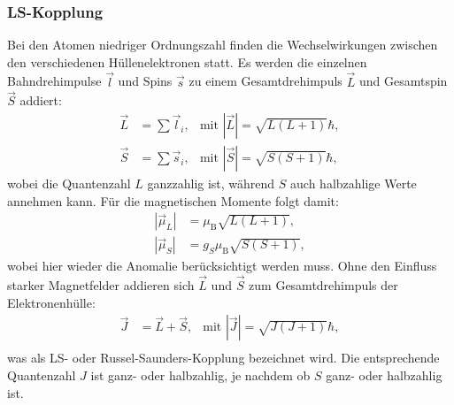 \documentclass{article}
\begin{document}
	\subsubsection{LS-Kopplung}
	Bei den Atomen niedriger Ordnungszahl finden die Wechselwirkungen zwischen den verschiedenen Hüllenelektronen statt. Es werden die einzelnen Bahndrehimpulse $\vec{l}$ und Spins $\vec{s}$ zu einem Gesamtdrehimpuls $\vec{L}$ und Gesamtspin $\vec{S}$ addiert:
	\begin{align}
	\vec{L}&=\sum\vec{l}_i, & \text{mit }|\vec{L}|=\sqrt{L(L+1)}\hbar,\\
	\vec{S}&=\sum\vec{s}_i, & \text{mit }|\vec{S}|=\sqrt{S(S+1)}\hbar,
	\end{align}
	wobei die Quantenzahl $L$ ganzzahlig ist, während $S$ auch halbzahlige Werte annehmen kann. Für die magnetischen Momente folgt damit:
	\begin{align}
	|\vec{\mu}_L|&=\mu_\text{B}\sqrt{L(L+1)},\\
	|\vec{\mu}_S|&=g_S\mu_\text{B}\sqrt{S(S+1)},
	\end{align}
	wobei hier wieder die Anomalie berücksichtigt werden muss.
	Ohne den Einfluss starker Magnetfelder addieren sich $\vec{L}$ und $\vec{S}$ zum Gesamtdrehimpuls der Elektronenhülle:
	\begin{align}
	\vec{J}&=\vec{L}+\vec{S}, & \text{mit }|\vec{J}|=\sqrt{J(J+1)}\hbar, \\
	\end{align}
	was als LS- oder Russel-Saunders-Kopplung bezeichnet wird. Die entsprechende Quantenzahl $J$ ist ganz- oder halbzahlig, je nachdem ob $S$ ganz- oder halbzahlig ist.
	
\end{document}
